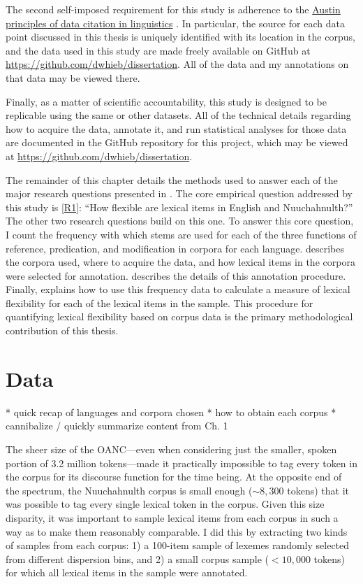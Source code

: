 The second self-imposed requirement for this study is adherence to the \href{https://site.uit.no/linguisticsdatacitation/}{Austin principles of data citation in linguistics} \parencite{BerezKroekeretal2018}. In particular, the source for each data point discussed in this thesis is uniquely identified with its location in the corpus, and the data used in this study are made freely available on GitHub at \url{https://github.com/dwhieb/dissertation}. All of the data and my annotations on that data may be viewed there.

Finally, as a matter of scientific accountability, this study is designed to be replicable using the same or other datasets. All of the technical details regarding how to acquire the data, annotate it, and run statistical analyses for those data are documented in the GitHub repository for this project, which may be viewed at \url{https://github.com/dwhieb/dissertation}.

The remainder of this chapter details the methods used to answer each of the major research questions presented in . The core empirical question addressed by this study is \ref{R1}: \enquote{How flexible are lexical items in English and Nuuchahnulth?} The other two research questions build on this one. To answer this core question, I count the frequency with which stems are used for each of the three functions of reference, predication, and modification in corpora for each language.  describes the corpora used, where to acquire the data, and how lexical items in the corpora were selected for annotation.  describes the details of this annotation procedure. Finally,  explains how to use this frequency data to calculate a measure of lexical flexibility for each of the lexical items in the sample. This procedure for quantifying lexical flexibility based on corpus data is the primary methodological contribution of this thesis.

\section{Data}
\label{sec:3.2}

* quick recap of languages and corpora chosen
* how to obtain each corpus
* cannibalize / quickly summarize content from Ch. 1

The sheer size of the OANC—even when considering just the smaller, spoken portion of 3.2 million tokens—made it practically impossible to tag every token in the corpus for its discourse function for the time being. At the opposite end of the spectrum, the Nuuchahnulth corpus is small enough ($\sim8,300$ tokens) that it was possible to tag every single lexical token in the corpus. Given this size disparity, it was important to sample lexical items from each corpus in such a way as to make them reasonably comparable. I did this by extracting two kinds of samples from each corpus: 1) a 100-item sample of lexemes randomly selected from different dispersion bins, and 2) a small corpus sample ($\less10,000$ tokens) for which all lexical items in the sample were annotated.

